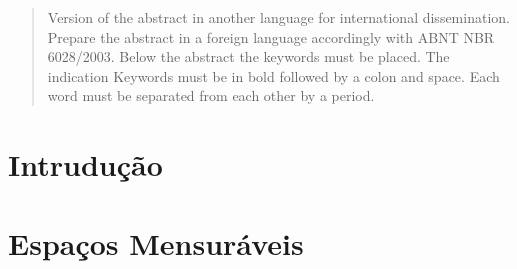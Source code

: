 \begin{abstract}
Version of the abstract in another language for international dissemination. Prepare the abstract in a foreign language accordingly with ABNT NBR 6028/2003. Below the abstract the keywords must be placed. The indication Keywords must be in bold followed by a colon and space. Each word must be separated from each other by a period.
\end{abstract}

\listoffigures   
\cleardoublepage

\listoftables
\cleardoublepage

\tableofcontents
\cleardoublepage

\chapter{Intrudução} %

\chapter{Espaços Mensuráveis}


